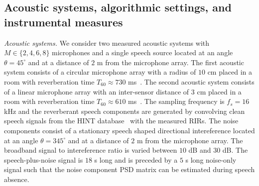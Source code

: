 \documentclass[10pt]{IEEEtran}
\begin{document}
\subsection{Acoustic systems, algorithmic settings, and instrumental measures}
\label{sec: ac_sys}

{\emph{Acoustic systems.}} \enspace
We consider two measured acoustic systems with $M \in \{ 2, 4, 6, 8\}$ microphones and a single speech source located at an angle $\theta = 45^{\circ}$ and at a distance of $2$ m from the microphone array.
The first acoustic system consists of a circular microphone array with a radius of $10$ cm placed in a room with reverberation time $T_{60} \approx 730$ ms~\cite{REVERB2016}.
The second acoustic system consists of a linear microphone array with an inter-sensor distance of $3$ cm placed in a room with reverberation time $T_{60} \approx 610$ ms~\cite{hadad_IWAENC_2014}.
The sampling frequency is $f_s = 16$ kHz and the reverberant speech components are generated by convolving clean speech signals from the HINT database~\cite{Nilsson_JASA_1994} with the measured RIRs.
The noise components consist of a stationary speech shaped directional intereference located at an angle $\theta = 345^{\circ}$ and at a distance of $2$ m from the microphone array.
The broadband signal to intereference ratio is varied between $10$ dB and $30$ dB.
The speech-plus-noise signal is $18$ s long and is preceded by a $5$ s long noise-only signal such that the noise component PSD matrix can be estimated during speech absence.
\end{document}
